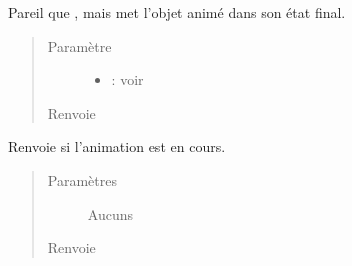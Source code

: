 \documentclass[letterpaper,10pt,french]{sphinxmanual}
\begin{document}
\begin{fulllineitems}
\begin{fulllineitems}
\label{\detokenize{animation:pygame_animations.Animation.fastforward}}
\sphinxAtStartPar
Pareil que {\hyperref[\detokenize{animation:stopmethod}]{}}, mais met l’objet animé dans son état final.
\begin{quote}\begin{description}
\item[{Paramètre}] \leavevmode\begin{itemize}
\item {} 
\sphinxAtStartPar
{} : voir {\hyperref[\detokenize{animation:stopmethod}]{}}

\end{itemize}

\item[{Renvoie}] \leavevmode
\sphinxAtStartPar
{}

\end{description}\end{quote}

\end{fulllineitems}


\begin{fulllineitems}
\label{\detokenize{animation:pygame_animations.Animation.is_running}}
\sphinxAtStartPar
Renvoie  si l’animation est en cours.
\begin{quote}\begin{description}
\item[{Paramètres}] \leavevmode
\sphinxAtStartPar
Aucuns

\item[{Renvoie}] \leavevmode
\sphinxAtStartPar
{}

\end{description}\end{quote}


\end{fulllineitems}
\end{fulllineitems}
\end{document}
